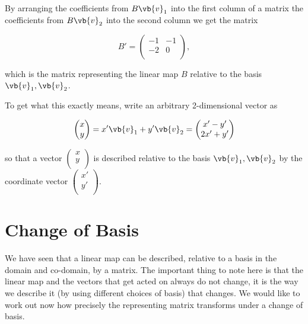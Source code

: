 \documentclass[a4paper,12pt]{report}
\begin{document}
By arranging the coefficients from \(B\vb{v} _{1} \) into the first column of a matrix the coefficients from \(B\vb{v} _{2} \) into the second column we get the matrix  

\begin{equation}
    B' = \begin{pmatrix}
        -1 &  -1 \\
        -2 &  0 \\
    \end{pmatrix},
\end{equation}

which is the matrix representing the linear map \(B\) relative to the basis \({\vb{v} _{1} ,\vb{v} _{2} }\).   

To get what this exactly means, write an arbitrary 2-dimensional vector as

\begin{equation}
    \begin{pmatrix}
         x \\
         y \\
    \end{pmatrix} = x'\vb{v} _{1}  + y'\vb{v} _{2} = \begin{pmatrix}
         x'-y' \\
         2x'+y' \\
    \end{pmatrix}  
\end{equation}

so that a vector \(\begin{pmatrix}
     x \\
     y \\
\end{pmatrix} \) is described relative to the basis \({\vb{v} _{1}, \vb{v} _{2}  }\) by the coordinate vector \(\begin{pmatrix}
     x' \\
     y' \\
\end{pmatrix}\).    

\section{Change of Basis}

We have seen that a linear map can be described, relative to a basis in the domain and co-domain, by a matrix. The important thing to note here is that the linear map and the vectors that get acted on always do not change, it is the way we describe it (by using different choices of basis) that changes. We would like to work out now how precisely the representing matrix transforms under a change of basis.
\end{document}
